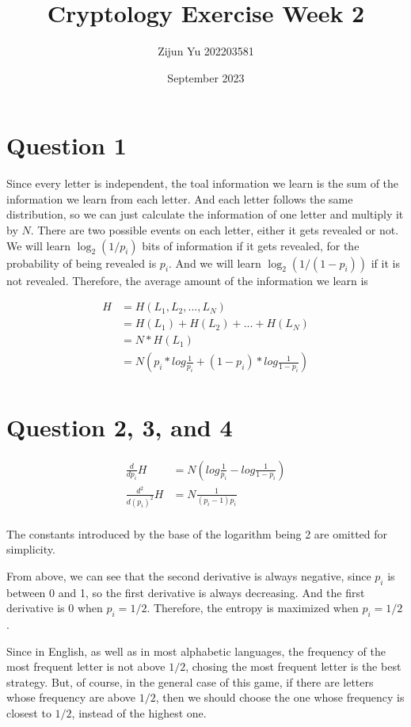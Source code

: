 \documentclass{article}
\title{Cryptology Exercise Week 2}
\author{Zijun Yu 202203581}
\date{September 2023}
\begin{document}
\maketitle

\section*{Question 1}

Since every letter is independent, the toal information we learn
is the sum of the information we learn from each letter.
And each letter follows the same distribution, so we can just
calculate the information of one letter and multiply it by $N$.
There are two possible events on each letter, either it gets revealed or not.
We will learn $\log_2 (1/p_i)$ bits of information if it gets revealed,
for the probability of being revealed is $p_i$. And we will learn
$\log_2(1/(1-p_i))$ if it is not revealed. Therefore, the average amount of
the information we learn is

\begin{equation*}
    \begin{split}
        H & = H(L_1, L_2, ..., L_N) \\
        & = H(L_1) + H(L_2) + ... + H(L_N) \\
        & = N * H(L_1) \\
        & = N (p_i * log \frac{1}{p_i} + (1-p_i) * log \frac{1}{1-p_i}) \\
    \end{split}
\end{equation*}

\section*{Question 2, 3, and 4}

\begin{equation*}
    \begin{split}
        \frac{d}{d p_i} H & = N (log \frac{1}{p_i} - log \frac{1}{1-p_i}) \\
        \frac{d^2}{d (p_i)^2} H & = N \frac{1}{(p_i-1)p_i } \\
    \end{split}
\end{equation*}

The constants introduced by the base of the logarithm being 2 are omitted for simplicity.

From above, we can see that the second derivative is always negative, since $p_i$ is between 0 and 1,
so the first derivative is always decreasing. And the first derivative is 0 when $p_i = 1/2$.
Therefore, the entropy is maximized when $p_i = 1/2$.

Since in English, as well as in most alphabetic languages,
the frequency of the most frequent letter is not above $1/2$, chosing the
most frequent letter is the best strategy. But, of course, in the general case of this game,
if there are letters whose
frequency are above $1/2$, then we should choose the one whose frequency is closest to $1/2$,
instead of the highest one.
\end{document}
